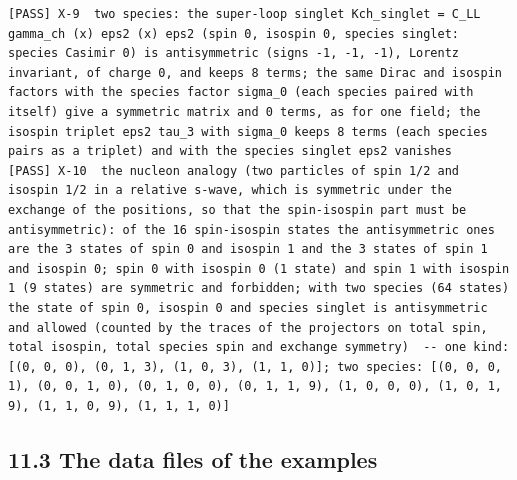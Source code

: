 \documentclass[
  10pt,
]{article}
\begin{document}
\begin{verbatim}
[PASS] X-9  two species: the super-loop singlet Kch_singlet = C_LL gamma_ch (x) eps2 (x) eps2 (spin 0, isospin 0, species singlet: species Casimir 0) is antisymmetric (signs -1, -1, -1), Lorentz invariant, of charge 0, and keeps 8 terms; the same Dirac and isospin factors with the species factor sigma_0 (each species paired with itself) give a symmetric matrix and 0 terms, as for one field; the isospin triplet eps2 tau_3 with sigma_0 keeps 8 terms (each species pairs as a triplet) and with the species singlet eps2 vanishes
[PASS] X-10  the nucleon analogy (two particles of spin 1/2 and isospin 1/2 in a relative s-wave, which is symmetric under the exchange of the positions, so that the spin-isospin part must be antisymmetric): of the 16 spin-isospin states the antisymmetric ones are the 3 states of spin 0 and isospin 1 and the 3 states of spin 1 and isospin 0; spin 0 with isospin 0 (1 state) and spin 1 with isospin 1 (9 states) are symmetric and forbidden; with two species (64 states) the state of spin 0, isospin 0 and species singlet is antisymmetric and allowed (counted by the traces of the projectors on total spin, total isospin, total species spin and exchange symmetry)  -- one kind: [(0, 0, 0), (0, 1, 3), (1, 0, 3), (1, 1, 0)]; two species: [(0, 0, 0, 1), (0, 0, 1, 0), (0, 1, 0, 0), (0, 1, 1, 9), (1, 0, 0, 0), (1, 0, 1, 9), (1, 1, 0, 9), (1, 1, 1, 0)]
\end{verbatim}

\hypertarget{the-data-files-of-the-examples}{%
\subsection{11.3 The data files of the
examples}\label{the-data-files-of-the-examples}}
\end{document}
